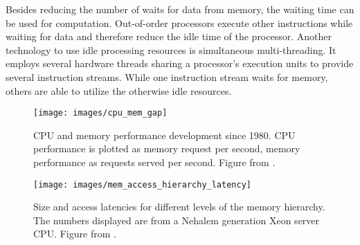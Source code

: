 Besides reducing the number of waits for data from memory, the waiting time can be
used for computation.
Out-of-order processors execute other instructions while waiting for data and
therefore reduce the idle time of the processor.
Another technology to use idle processing resources is simultaneous
multi-threading.
It employs several hardware threads sharing a processor's execution units to
provide several instruction streams.
While one instruction stream waits for memory, others are able to utilize the
otherwise idle resources.
%
\begin{figure}[h]
  \centering
  \texttt{[image: images/cpu\_mem\_gap]}
  \caption[Processor and memory performance gap 1980 - 2010.]
    {CPU and memory performance development since 1980.
      CPU performance is plotted as memory request per second, memory
      performance as requests served per second.
      Figure from \cite[73]{hennessy_computer_2012}.}
  \label{intro:fig:cpuMemGap}
\end{figure}
%
\begin{comment}
To reduce the number of waits and obscure the gap, several levels of caches
are present on today's processors, thus decreasing the impact of memory latency.
The drawback of several layers of caches and increasing size of caches is the
access latency and the additional cost for a cache miss, when the data
requested is not in any cache layer.
Each cache level adds the time it takes to search it, to the overall
time it takes to request the data from memory.
Thus, three cache levels cost search time for the first, second, and third plus
the memory latency.
In short, larger caches decrease the miss probability, but increase the overall
memory access latency.
Figure \ref{into:fig:accessLatencies} provides and overview over size and
access times for the memory hierarchy.
The displayed access times describe the duration from issuing the request until
receiving the data.
\end{comment}
%
\begin{figure}[h]
  \texttt{[image: images/mem\_access\_hierarchy\_latency]}
  \caption{Size and access latencies for different levels of the
    memory hierarchy.
    The numbers displayed are from a Nehalem generation
    Xeon\texttrademark{} server CPU.
    Figure from \cite[72]{hennessy_computer_2012}.}
  \label{intro:fig:accessLatencies}
\end{figure}
\begin{comment}
Two hardware improvements minimize the time a CPU idles, while waiting for
memory: out-of-order execution and simultaneous multi-threading.
Out-of-order CPUs reorder instructions, such that a instruction waiting for
input data is surpassed by instructions with available input.
After execution the results are written to memory in their original order.
Whereas simultaneous multi-threading employs two or more hardware threads
executing on the same physical hardware.
If one hardware thread waits for memory or just uses a subset of all available
execution units, the others can utilize the idle resources.
\end{comment}

